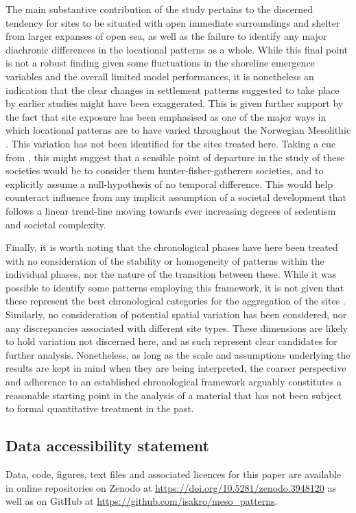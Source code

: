 \documentclass[12pt, a4paper]{article}
\begin{document}
The main substantive contribution of the study pertains to the discerned tendency for sites to be situated with open immediate surroundings and shelter from larger expanses of open sea, as well as the failure to identify any major diachronic differences in the locational patterns as a whole. While this final point is not a robust finding given some fluctuations in the shoreline emergence variables and the overall limited model performances, it is nonetheless an indication that the clear changes in settlement patterns suggested to take place by earlier studies might have been exaggerated. This is given further support by the fact that site exposure has been emphasised as one of the major ways in which locational patterns are to have varied throughout the Norwegian Mesolithic \citep[e.g.][]{lindblom1984, jaksland2001, bjerck2008, breivik2014, breivik2018}. This variation has not been identified for the sites treated here. Taking a cue from \cite{aastveit2014}, this might suggest that a sensible point of departure in the study of these societies would be to consider them hunter-fisher-gatherers societies, and to explicitly assume a null-hypothesis of no temporal difference. This would help counteract influence from any implicit assumption of a societal development that follows a linear trend-line moving towards ever increasing degrees of sedentism and societal complexity.\par 
Finally, it is worth noting that the chronological phases have here been treated with no consideration of the stability or homogeneity of patterns within the individual phases, nor the nature of the transition between these. While it was possible to identify some patterns employing this framework, it is not given that these represent the best chronological categories for the aggregation of the sites \citep{reitan2016}. Similarly, no consideration of potential spatial variation has been considered, nor any discrepancies associated with different site types. These dimensions are likely to hold variation not discerned here, and as such represent clear candidates for further analysis. Nonetheless, as long as the scale and assumptions underlying the results are kept in mind when they are being interpreted, the coarser perspective and adherence to an established chronological framework arguably constitutes a reasonable starting point in the analysis of a material that has not been subject to formal quantitative treatment in the past.\par

\subsection*{Data accessibility statement}
Data, code, figures, text files and associated licences for this paper are available in online repositories on Zenodo at \url{https://doi.org/10.5281/zenodo.3948120} as well as on GitHub at \url{https://github.com/isakro/meso_patterns}. 
\end{document}
